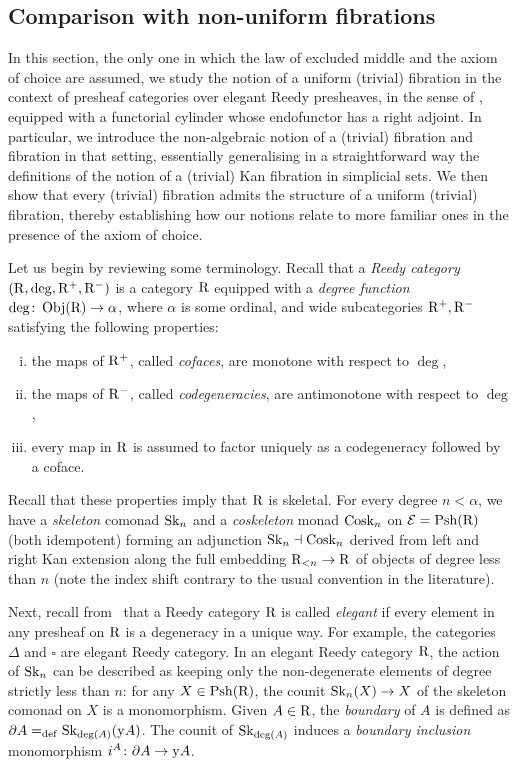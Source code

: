\documentclass[reqno,10pt,a4paper,oneside,draft]{amsart}
\begin{document}
\subsection*{Comparison with non-uniform fibrations}

In this section, the only one in which the law of excluded middle and the axiom of choice are assumed, we study the notion of a uniform (trivial) fibration in the context of presheaf categories over elegant Reedy presheaves, in the sense of \cite{bergner-rezk-elegant}, equipped with a functorial cylinder whose endofunctor has a right adjoint.
In particular, we introduce the non-algebraic notion of a (trivial) fibration and fibration in that setting, essentially generalising in a straightforward way the definitions of the notion of a (trivial) Kan fibration in simplicial sets.
We then show that every (trivial) fibration admits the structure of a uniform (trivial) fibration, thereby establishing how our notions relate to more familiar ones in the presence of the axiom of choice.

\medskip

Let us begin by reviewing some terminology.
Recall that a \emph{Reedy category} $(\mathrm{R}, \deg, \mathrm{R}^+, \mathrm{R}^-)$ is a category $\mathrm{R}$ equipped with a \emph{degree function} $\deg \colon \operatorname{Obj}(\mathrm{R}) \to \alpha$, where $\alpha$ is some ordinal, and wide subcategories $\mathrm{R}^+, \mathrm{R}^-$ satisfying the following properties:
\begin{enumerate}[(i)]
\item the maps of $\mathrm{R}^+$, called \emph{cofaces}, are monotone with respect to $\deg$,
\item the maps of $\mathrm{R}^-$, called \emph{codegeneracies}, are antimonotone with respect to $\deg$,
\item every map in $\mathrm{R}$ is assumed to factor uniquely as a codegeneracy followed by a coface.
\end{enumerate}
Recall that these properties imply that $\mathrm{R}$ is skeletal.
For every degree $n < \alpha$, we have a \emph{skeleton} comonad $\operatorname{Sk}_n$ and a \emph{coskeleton} monad $\operatorname{Cosk}_n$ on $\mathcal{E} = \mathrm{Psh}(\mathrm{R})$ (both idempotent) forming an adjunction $\operatorname{Sk}_n \dashv \operatorname{Cosk}_n$ derived from left and right Kan extension along the full embedding $\mathrm{R}_{<n} \to \mathrm{R}$ of objects of degree less than $n$ (note the index shift contrary to the usual convention in the literature).

\medskip

Next, recall from~\cite{bergner-rezk-elegant} that a Reedy category $\mathrm{R}$ is called \emph{elegant} if every element in any presheaf on $\mathrm{R}$ is a degeneracy in a unique way.
For example, the categories $\Delta$ and $\square$ are elegant Reedy category.
In an elegant Reedy category $\mathrm{R}$, the action of $\operatorname{Sk}_n$ can be described as keeping only the non-degenerate elements of degree strictly less than $n$: for any $X \in \mathrm{Psh}(\mathrm{R})$, the counit $\operatorname{Sk}_n(X) \to X$ of the skeleton comonad on $X$ is a monomorphism.
Given $A \in \mathrm{R}$, the \emph{boundary} of $A$ is defined as $\partial A =_{\operatorname{def}} \operatorname{Sk}_{\deg(A)}(\mathrm{y} A)$.
The counit of $\operatorname{Sk}_{\deg(A)}$ induces a \emph{boundary inclusion} monomorphism $i^A \colon \partial A \to \mathrm{y} A$.
\end{document}
